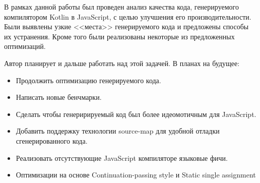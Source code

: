 \startconclusionpage


В рамках данной работы был проведен анализ качества кода, генерируемого компилятором Kotlin в JavaScript, с целью улучшения его производительности. Были выявлены узкие <<места>> генерируемого кода и предложены способы их устранения. Кроме того были реализованы некоторые из предложенных оптимизаций.


Автор планирует и дальше работать над этой задачей. В планах на будущее:
\begin{itemize}
\item Продолжить оптимизацию генерируемого кода.
\item Написать новые бенчмарки. 
\item Сделать чтобы генеририруемый код был более идеомотичным для JavaScript.
\item Добавить поддержку технологии source-map для удобной отладки сгенерированного кода.
\item Реализовать отсутствующие JavaScript компиляторе языковые фичи.
\item Оптимизации на основе Continuation-passing style и 
Static single assignment
\end{itemize}
